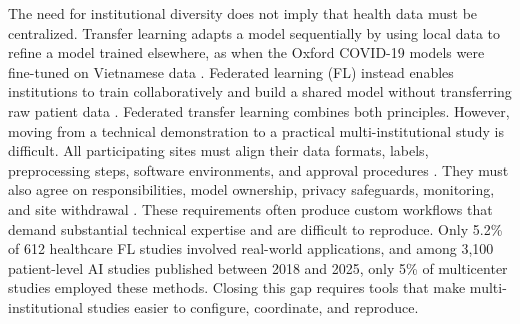 \documentclass[preprint,5p, 10pt, times]{elsarticle}
\begin{document}
The need for institutional diversity does not imply that health data must be centralized.
%
Transfer learning adapts a model sequentially by using local data to refine a model trained elsewhere, as when the Oxford COVID-19 models were fine-tuned on Vietnamese data \cite{yang2024generalizability}.
%
Federated learning (FL) instead enables institutions to train collaboratively and build a shared model without transferring raw patient data \cite{mcmahan2017communication,ur2021federated}. 
%
Federated transfer learning combines both principles.
%
However, moving from a technical demonstration to a practical multi-institutional study is difficult. 
All participating sites must align their data formats, labels, preprocessing steps, software environments, and approval procedures \cite{pati2022federated,welten2024study}. 
They must also agree on responsibilities, model ownership, privacy safeguards, monitoring, and site withdrawal \cite{barbereau2025governance,eden2025scoping}. These requirements often produce custom workflows that demand substantial technical expertise and are difficult to reproduce.
%
Only 5.2\% of 612 healthcare FL studies involved real-world applications\cite{teo2024federated}, and among 3,100 patient-level AI studies published between 2018 and 2025, only 5\% of multicenter studies employed these methods\cite{jafarinezhad2026centralized}. 
%
Closing this gap requires tools that make multi-institutional studies easier to configure, coordinate, and reproduce\cite{pati2022federated,matschinske2023featurecloud,cremonesi2025fed}. 
\end{document}
